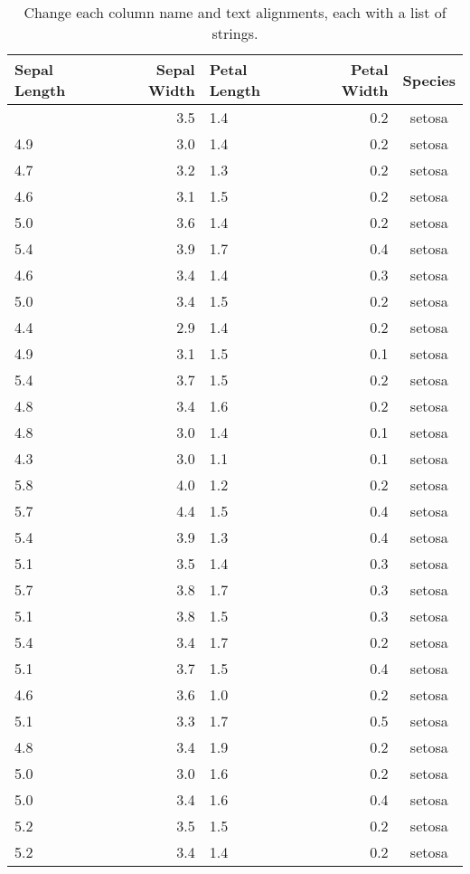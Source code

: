 \documentclass[
  letterpaper,
  DIV=11,
  numbers=noendperiod]{scrartcl}
\begin{document}
\begin{longtable}[]{@{}lrlrc@{}}

\caption{\label{tbl-column-names-alignment1}Change each column name and
text alignments, each with a list of strings.}

\tabularnewline

\toprule\noalign{}
Sepal Length & Sepal Width & Petal Length & Petal Width & Species \\
\midrule\noalign{}
\endhead
\bottomrule\noalign{}
\endlastfoot
5.1 & 3.5 & 1.4 & 0.2 & setosa \\
4.9 & 3.0 & 1.4 & 0.2 & setosa \\
4.7 & 3.2 & 1.3 & 0.2 & setosa \\
4.6 & 3.1 & 1.5 & 0.2 & setosa \\
5.0 & 3.6 & 1.4 & 0.2 & setosa \\
5.4 & 3.9 & 1.7 & 0.4 & setosa \\
4.6 & 3.4 & 1.4 & 0.3 & setosa \\
5.0 & 3.4 & 1.5 & 0.2 & setosa \\
4.4 & 2.9 & 1.4 & 0.2 & setosa \\
4.9 & 3.1 & 1.5 & 0.1 & setosa \\
5.4 & 3.7 & 1.5 & 0.2 & setosa \\
4.8 & 3.4 & 1.6 & 0.2 & setosa \\
4.8 & 3.0 & 1.4 & 0.1 & setosa \\
4.3 & 3.0 & 1.1 & 0.1 & setosa \\
5.8 & 4.0 & 1.2 & 0.2 & setosa \\
5.7 & 4.4 & 1.5 & 0.4 & setosa \\
5.4 & 3.9 & 1.3 & 0.4 & setosa \\
5.1 & 3.5 & 1.4 & 0.3 & setosa \\
5.7 & 3.8 & 1.7 & 0.3 & setosa \\
5.1 & 3.8 & 1.5 & 0.3 & setosa \\
5.4 & 3.4 & 1.7 & 0.2 & setosa \\
5.1 & 3.7 & 1.5 & 0.4 & setosa \\
4.6 & 3.6 & 1.0 & 0.2 & setosa \\
5.1 & 3.3 & 1.7 & 0.5 & setosa \\
4.8 & 3.4 & 1.9 & 0.2 & setosa \\
5.0 & 3.0 & 1.6 & 0.2 & setosa \\
5.0 & 3.4 & 1.6 & 0.4 & setosa \\
5.2 & 3.5 & 1.5 & 0.2 & setosa \\
5.2 & 3.4 & 1.4 & 0.2 & setosa \\

\end{longtable}
\end{document}
